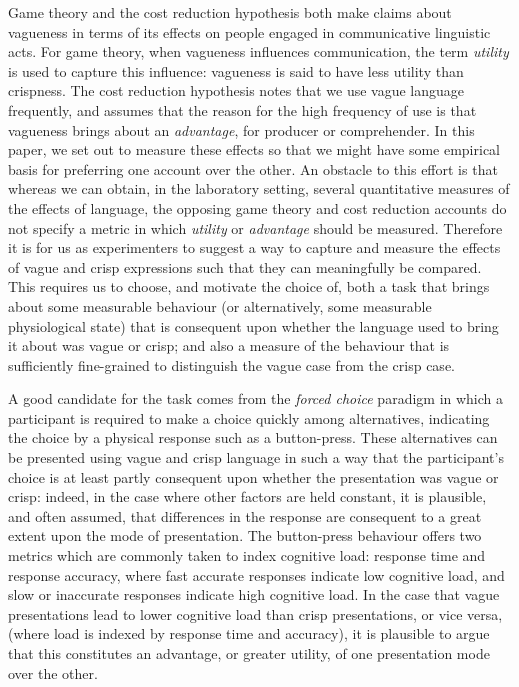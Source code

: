 \documentclass[doc,floatmark]{apa}
\begin{document}
Game theory and the cost reduction hypothesis both make claims about vagueness in terms of its effects on people engaged in communicative linguistic acts. For game theory, when vagueness influences communication, the term \emph{utility} is used to capture this influence: vagueness is said to have less utility than crispness. The cost reduction hypothesis notes that we use vague language frequently, and assumes that the reason for the high frequency of use is that vagueness brings about an \emph{advantage}, for producer or comprehender. In this paper, we set out to measure these effects so that we might have some empirical basis for preferring one account over the other. An obstacle to this effort is that whereas we can obtain, in the laboratory setting, several quantitative measures of the effects of language, the opposing game theory and cost reduction accounts do not specify a metric in which \emph{utility} or \emph{advantage} should be measured. Therefore it is for us as experimenters to suggest a way to capture and measure the effects of vague and crisp expressions such that they can meaningfully be compared. This requires us to choose, and motivate the choice of, both a task that brings about some measurable behaviour (or alternatively, some measurable physiological state) that is consequent upon whether the language used to bring it about was vague or crisp; and also a measure of the behaviour that is sufficiently fine-grained to distinguish the vague case from the crisp case.

A good candidate for the task comes from the \emph{forced choice} paradigm in which a participant is required to make a choice quickly among alternatives, indicating the choice by a physical response such as a button-press. These alternatives can be presented using vague and crisp language in such a way that the participant's choice is at least partly consequent upon whether the presentation was vague or crisp: indeed, in the case where other factors are held constant, it is plausible, and often assumed, that differences in the response are consequent to a great extent upon the mode of presentation. The button-press behaviour offers two metrics which are commonly taken to index cognitive load: response time and response accuracy, where fast accurate responses indicate low cognitive load, and slow or inaccurate responses indicate high cognitive load. In the case that vague presentations lead to lower cognitive load than crisp presentations, or vice versa, (where load is indexed by response time and accuracy), it is plausible to argue that this constitutes an advantage, or greater utility, of one presentation mode over the other.
\end{document}
